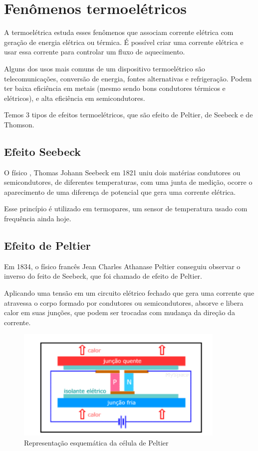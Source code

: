 \section{Fenômenos termoelétricos}
A termoelétrica estuda esses fenômenos que associam corrente elétrica com geração de energia elétrica ou térmica. É possível criar uma corrente elétrica e usar essa corrente para controlar um fluxo de aquecimento.

Alguns dos usos mais comuns de um dispositivo termoelétrico são telecomunicações, conversão de energia, fontes alternativas e refrigeração. Podem ter baixa eficiência em metais (mesmo sendo bons condutores térmicos e elétricos), e alta eficiência em semicondutores.

Temos 3 tipos de efeitos termoelétricos, que são efeito de Peltier, de Seebeck e de Thomson.

\subsection{Efeito Seebeck}
O físico , Thomas Johann Seebeck em 1821 uniu dois matérias condutores ou semicondutores, de diferentes temperaturas, com uma junta de medição, ocorre o aparecimento de uma diferença de potencial que gera uma corrente elétrica. 

Esse princípio é utilizado em termopares, um sensor de temperatura usado com frequência ainda hoje. 

\subsection{Efeito de Peltier}
Em 1834, o físico francês Jean Charles Athanase Peltier conseguiu observar o inverso do feito de Seebeck, que foi chamado de efeito de Peltier.

Aplicando uma tensão em um circuito elétrico fechado que gera uma corrente que atravessa o corpo formado por condutores ou semicondutores, absorve e libera calor em suas junções, que podem ser trocadas com mudança da direção da corrente.

\begin{figure}[H]
\centering
\includegraphics[width=10cm]{figuras/efeitopeltier.png}
\caption{Representação esquemática da célula de Peltier}
\end{figure}

